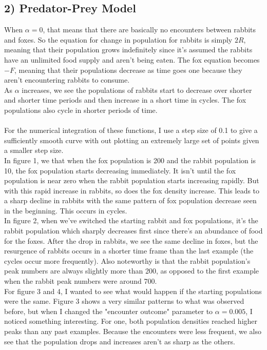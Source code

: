 \documentclass[12pt, oneside]{article}
\begin{document}
\subsection*{2) Predator-Prey Model}
When $\alpha=0$, that means that there are basically no encounters between rabbits and foxes. So the equation for change in population for rabbits is simply $2R$, meaning that their population grows indefinitely since it's assumed the rabbits have an unlimited food supply and aren't being eaten. The fox equation becomes $-F$, meaning that their populations decrease as time goes one because they aren't encountering rabbits to consume.\\
As $\alpha$ increases, we see the populations of rabbits start to decrease over shorter and shorter time periods and then increase in a short time in cycles. The fox populations also cycle in shorter periods of time.\\\\
For the numerical integration of these functions, I use a step size of 0.1 to give a sufficiently smooth curve with out plotting an extremely large set of points given a smaller step size.\\
In figure 1, we that when the fox population is 200 and the rabbit population is 10, the fox population starts decreasing immediately. It isn't until the fox population is near zero when the rabbit population starts increasing rapidly. But with this rapid increase in rabbits, so does the fox density increase. This leads to a sharp decline in rabbits with the same pattern of fox population decrease seen in the beginning. This occurs in cycles.\\
In figure 2, when we've switched the starting rabbit and fox populations, it's the rabbit population which sharply decreases first since there's an abundance of food for the foxes. After the drop in rabbits, we see the same decline in foxes, but the resurgence of rabbits occurs in a shorter time frame than the last example (the cycles occur more frequently). Also noteworthy is that the rabbit population's peak numbers are always slightly more than 200, as opposed to the first example when the rabbit peak numbers were around 700.\\
For figure 3 and 4, I wanted to see what would happen if the starting populations were the same. Figure 3 shows a very similar patterns to what was observed before, but when I changed the "encounter outcome" parameter to $\alpha=0.005$, I noticed something interesting. For one, both population densities reached higher peaks than any past examples. Because the encounters were less frequent, we also see that the population drops and increases aren't as sharp as the others.\\
\end{document}
